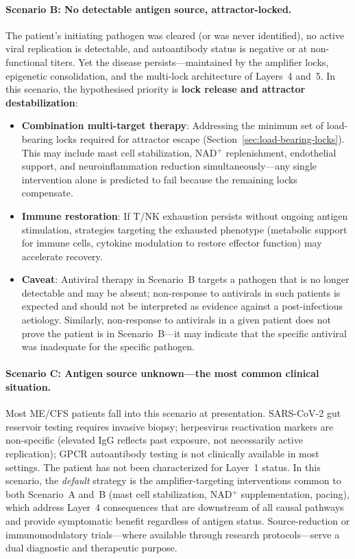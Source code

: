 \paragraph{Scenario B: No detectable antigen source, attractor-locked.} The patient's initiating pathogen was cleared (or was never identified), no active viral replication is detectable, and autoantibody status is negative or at non-functional titers. Yet the disease persists---maintained by the amplifier locks, epigenetic consolidation, and the multi-lock architecture of Layers~4 and~5. In this scenario, the hypothesised priority is \textbf{lock release and attractor destabilization}:

\begin{itemize}
    \item \textbf{Combination multi-target therapy}: Addressing the minimum set of load-bearing locks required for attractor escape (Section~\ref{sec:load-bearing-locks}). This may include mast cell stabilization, NAD$^+$ replenishment, endothelial support, and neuroinflammation reduction simultaneously---any single intervention alone is predicted to fail because the remaining locks compensate.
    \item \textbf{Immune restoration}: If T/NK exhaustion persists without ongoing antigen stimulation, strategies targeting the exhausted phenotype (metabolic support for immune cells, cytokine modulation to restore effector function) may accelerate recovery.
    \item \textbf{Caveat}: Antiviral therapy in Scenario~B targets a pathogen that is no longer detectable and may be absent; non-response to antivirals in such patients is expected and should not be interpreted as evidence against a post-infectious aetiology. Similarly, non-response to antivirals in a given patient does not prove the patient is in Scenario~B---it may indicate that the specific antiviral was inadequate for the specific pathogen.
\end{itemize}

\paragraph{Scenario C: Antigen source unknown---the most common clinical situation.} Most ME/CFS patients fall into this scenario at presentation. SARS-CoV-2 gut reservoir testing requires invasive biopsy; herpesvirus reactivation markers are non-specific (elevated IgG reflects past exposure, not necessarily active replication); GPCR autoantibody testing is not clinically available in most settings. The patient has not been characterized for Layer~1 status. In this scenario, the \emph{default} strategy is the amplifier-targeting interventions common to both Scenario~A and~B (mast cell stabilization, NAD$^+$ supplementation, pacing), which address Layer~4 consequences that are downstream of all causal pathways and provide symptomatic benefit regardless of antigen status. Source-reduction or immunomodulatory trials---where available through research protocols---serve a dual diagnostic and therapeutic purpose.


